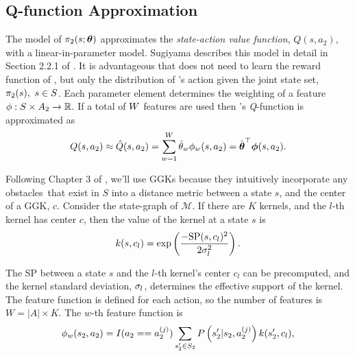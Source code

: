 \subsection{Q-function Approximation}\label{sec:policy_parameterization}
    The model of $\pi_{2}(s; \boldsymbol{\mathbb{\theta}})$ approximates the \textit{state-action value function}, $Q(s,a_2)$, with a
    linear-in-parameter model. Sugiyama describes this model in detail in Section 2.2.1 of
    \cite{Sugiyama2015StatisticalRL}. It is advantageous that  does not need to learn the reward function of
    , but only the distribution of 's action given the joint state set, $\pi_{2}(s),\ s\in S$. Each
    parameter element determines the weighting of a feature $\phi : S \times A_2 \rightarrow \mathbb{R}$. If a total of
    $W$ features are used then 's \textit{Q}-function is approximated as
    \begin{equation*}\label{eq:QFuncApprox}
        Q(s,a_2) \approx \hat{Q}(s,a_2)
            = \sum_{w=1}^{W} \hat{\theta}_{w} \phi_{w}(s,a_2)
            = \hat{\boldsymbol{\mathbb{\theta}}}^\top \boldsymbol{\mathbb{\phi}}(s, a_2).
    \end{equation*}

    Following Chapter 3 of \cite{Sugiyama2015StatisticalRL}, we'll use \acp{GGK} because they intuitively incorporate
    any obstacles\footnotemark\ that exist in $S$ into a distance metric between a state $s$, and the center of a
    \ac{GGK}, $c$. Consider the state-graph of $\mathcal{M}$. If there are $K$ kernels, and the $l$-th kernel has center
    $c$, then the value of the kernel at a state $s$ is
    \begin{equation*}
        k(s,c_{l}) = \exp \left( \frac{-\text{SP}(s,c_{l})^2}
            {2\sigma^2_{l}} \right).
    \end{equation*}


    \noindent
    The \ac{SP} between a state $s$ and the $l$-th kernel's center $c_l$ can be precomputed, and the kernel standard
    deviation, $\sigma_{l}$, determines the effective support of the kernel. The feature function is defined
    for each action, so the number of features is $W = |A| \times K$. The $w$-th feature function is
    \begin{equation}\label{eq:kernel_func}
        \phi_{w}(s_2,a_2) = I(a_2==a_2^{(j)})\sum_{s_2'\in S_2}P\left(s_2'|s_2,a_2^{(j)}\right)
            k(s_2',c_{l}),
    \end{equation}

